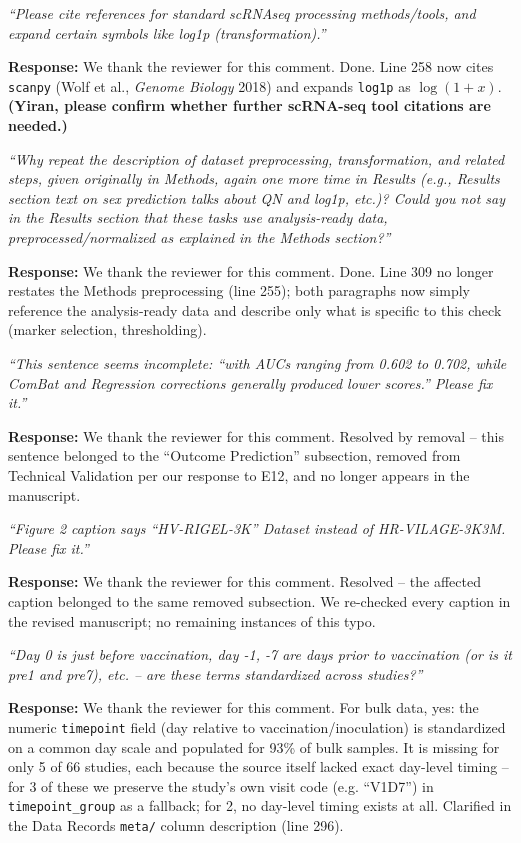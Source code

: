 \documentclass[11pt]{article}
\newcommand{\origcomment}[1]{\textit{``#1''}}
\newcommand{\filledresponse}[1]{%
  \par\medskip\noindent\textbf{Response:} #1\par
  \vspace{0.4cm}%
  \par\noindent\hrulefill\par\bigskip
}
\begin{document}
\begin{commentlist}

\item[R2-m1.] \origcomment{Please cite references for standard scRNAseq processing methods/tools,
and expand certain symbols like log1p (transformation).}
\filledresponse{We thank the reviewer for this comment. Done. Line 258 now cites \texttt{scanpy}
(Wolf et al., \textit{Genome Biology} 2018) and expands \texttt{log1p} as $\log(1+x)$.
\textbf{(Yiran, please confirm whether further scRNA-seq tool citations are needed.)}}

\item[R2-m2.] \origcomment{Why repeat the description of dataset preprocessing, transformation,
and related steps, given originally in Methods, again one more time in Results (e.g., Results
section text on sex prediction talks about QN and log1p, etc.)? Could you not say in the Results
section that these tasks use analysis-ready data, preprocessed/normalized as explained in the
Methods section?}
\filledresponse{We thank the reviewer for this comment. Done. Line 309 no longer restates the
Methods preprocessing (line 255); both paragraphs now simply reference the analysis-ready data
and describe only what is specific to this check (marker selection, thresholding).}

\item[R2-m3.] \origcomment{This sentence seems incomplete: ``with AUCs ranging from 0.602 to
0.702, while ComBat and Regression corrections generally produced lower scores.'' Please fix it.}
\filledresponse{We thank the reviewer for this comment. Resolved by removal -- this sentence
belonged to the ``Outcome Prediction'' subsection, removed from Technical Validation per our
response to E12, and no longer appears in the manuscript.}

\item[R2-m4.] \origcomment{Figure 2 caption says ``HV-RIGEL-3K'' Dataset instead of
HR-VILAGE-3K3M. Please fix it.}
\filledresponse{We thank the reviewer for this comment. Resolved -- the affected caption belonged
to the same removed subsection. We re-checked every caption in the revised manuscript; no
remaining instances of this typo.}

\item[R2-m5.] \origcomment{Day 0 is just before vaccination, day -1, -7 are days prior to
vaccination (or is it pre1 and pre7), etc. -- are these terms standardized across studies?}
\filledresponse{We thank the reviewer for this comment. For bulk data, yes: the numeric
\texttt{timepoint} field (day relative to vaccination/inoculation) is standardized on a common day
scale and populated for 93\% of bulk samples. It is missing for only 5 of 66 studies, each because
the source itself lacked exact day-level timing -- for 3 of these we preserve the study's own
visit code (e.g. ``V1D7'') in \texttt{timepoint\_group} as a fallback; for 2, no day-level timing
exists at all. Clarified in the Data Records \texttt{meta/} column description (line 296).}


\end{commentlist}
\end{document}
